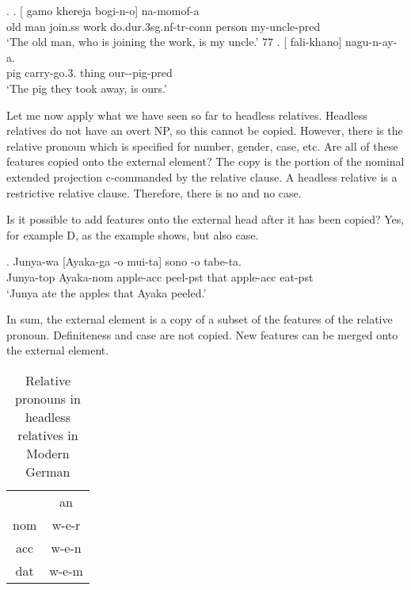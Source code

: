  \ex.
 \ag. [ gamo khereja bogi-n-o]  na-momof-a\\
  {old man} join.\ac{ss} work do.\ac{dur}.3\ac{sg}.\ac{nf}-\ac{tr}-\ac{conn} person my-uncle-\ac{pred}\\
  `The old man, who is joining the work, is my uncle.' 77
 \bg. [ fali-khano]  nagu-n-ay-a.\\
  pig carry-go.3. thing our--pig-\ac{pred}\\
  `The pig they took away, is ours.' 

 Let me now apply what we have seen so far to headless relatives. Headless relatives do not have an overt NP, so this cannot be copied. However, there is the relative pronoun which is specified for number, gender, case, etc. Are all of these features copied onto the external element? The copy is the portion of the nominal extended projection c-commanded by the relative clause. A headless relative is a restrictive relative clause. Therefore, there is no  and no case.

 Is it possible to add features onto the external head after it has been copied? Yes, for example D, as the example shows, but also case.

 \exg. Junya-wa [Ayaka-ga -o mui-ta] sono -o tabe-ta.\\
 Junya-\ac{top} Ayaka-\ac{nom} apple-\ac{acc} peel-\ac{pst} that apple-\ac{acc} eat-\ac{pst}\\
 ‘Junya ate the apples that Ayaka peeled.’ 

 In sum, the external element is a copy of a subset of the features of the relative pronoun. Definiteness and case are not copied. New features can be merged onto the external element.



\begin{table}[H]
 \center
 \caption {Relative pronouns in headless relatives in Modern German}
  \begin{tabular}{cc}
  \toprule
              & \ac{an} \\
    \cmidrule{2-2}
    \ac{nom}  & w-e-r  \\
    \ac{acc}  & w-e-n  \\
    \ac{dat}  & w-e-m  \\
  \bottomrule
  \end{tabular}
\end{table}


